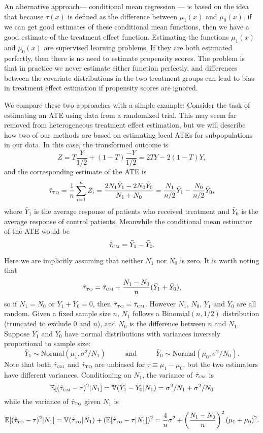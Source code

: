 \documentclass{article}
\def\mE{\mathbb{E}}\def\mI{\mathbb{I}}\def\mP{\mathbb{P}}\def\mR{\mathbb{R}}
\def\mV{\mathbb{V}}
\def\tauCM{\hat\tau_{\mbox{\tiny CM}}}
\def\tauTO{\hat\tau_{\mbox{\tiny TO}}}
\begin{document}
An alternative approach--- conditional mean regression --- is based on the idea that
because $\tau(x)$ is defined as the difference between $\mu_1(x)$ and
$\mu_0(x)$, if we can get good estimates of these conditional mean functions,
then we have a good estimate of the treatment effect function. Estimating the
functions $\mu_1(x)$ and $\mu_0(x)$ are supervised learning problems. If they
are both estimated perfectly, then there is no need to estimate propensity
scores. The problem is that in practice we never estimate either function
perfectly, and differences between the covariate distributions in the two
treatment groups can lead to bias in treatment effect estimation if propensity
scores are ignored.

We compare these two approaches with a simple example: Consider the task of
estimating an ATE using data from a randomized trial. This may seem far removed
from heterogeneous treatment effect estimation, but we will describe how two of
our methods are based on estimating local ATEs for subpopulations in our data.
In this case, the transformed outcome is
$$Z = T\frac Y{1/2} + (1 - T)\frac{-Y}{1/2} = 2TY - 2(1 - T)Y,$$
and the corresponding estimate of the ATE is
$$\tauTO =
  \frac1n\sum_{i=1}^nZ_i = \frac{2N_1\bar Y_1 - 2N_0\bar Y_0}{N_1 + N_0} =
  \frac{N_1}{n/2}\bar Y_1 - \frac{N_0}{n/2}\bar Y_0,$$
where $\bar Y_1$ is the average response of patients who received treatment and
$\bar Y_0$ is the average response of control patients.
Meanwhile the conditional mean estimator of the ATE would be
$$\tauCM = \bar Y_1 - \bar Y_0.$$

Here we are implicitly assuming that neither $N_1$ nor $N_0$ is zero.
It is worth noting that
$$\tauTO = \tauCM + \frac{N_1 - N_0}{n}(\bar Y_1 + \bar Y_0),$$
so if $N_1 = N_0$ or $\bar Y_1 + \bar Y_0 = 0$, then
$\tauTO = \tauCM$. However
$N_1$, $N_0$, $\bar Y_1$ and $\bar Y_0$ are all random. Given a fixed sample
size $n$, $N_1$ follows a Binomial$(n, 1/2)$ distribution
(truncated to exclude 0 and $n$), and $N_0$ is the
difference between $n$ and $N_1$. Suppose $\bar Y_1$ and $\bar Y_0$ have normal
distributions with variances inversely proportional to sample size:
$$\bar Y_1 \sim \mbox{Normal}(\mu_1, \sigma^2/N_1) \hspace{1cm} \mbox{ and }
  \hspace{1cm} \bar Y_0 \sim \mbox{Normal}(\mu_0, \sigma^2/N_0).$$
Note that both $\tauCM$ and
$\tauTO$ are unbiased for $\tau \equiv \mu_1 - \mu_0$,
but the two estimators have different variances. Conditioning on $N_1$, the
variance of $\tauCM$ is
$$\mE[(\tauCM - \tau)^2 | N_1] = \mV(\bar Y_1 - \bar Y_0|N_1) =
  \sigma^2/N_1 + \sigma^2/N_0$$
while the variance of $\tauTO$ given $N_1$ is
$$\mE[(\tauTO - \tau)^2 | N_1] = \mV(\tauTO|N_1) +
  (\mE[\tauTO - \tau|N_1])^2 =
  \frac4n\sigma^2 + \left(\frac{N_1 - N_0}n\right)^2(\mu_1 + \mu_0)^2.$$
\end{document}
